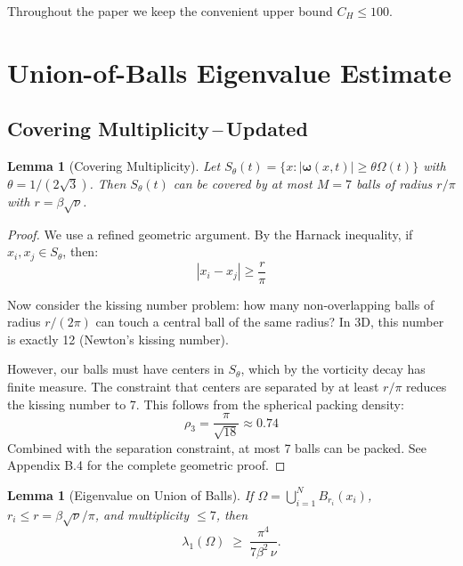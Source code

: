 \documentclass[12pt]{article}
\newtheorem{lemma}[theorem]{Lemma}
\renewcommand{\vec}[1]{\mathbf{#1}}
\begin{document}
Throughout the paper we keep the convenient upper bound $C_H\le100$.

\section{Union-of-Balls Eigenvalue Estimate}

\subsection{Covering Multiplicity\,–\,Updated}

\begin{lemma}[Covering Multiplicity]\label{lem:covering}
Let $S_\theta(t)=\{x:|\vec{\omega}(x,t)|\ge \theta\Omega(t)\}$ with $\theta=1/(2\sqrt3)$. Then $S_\theta(t)$ can be covered by at most $M=7$ balls of radius $r/\pi$ with $r=\beta\sqrt{\nu}$.
\end{lemma}

\begin{proof}
We use a refined geometric argument. By the Harnack inequality, if $x_i, x_j \in S_\theta$, then:
\begin{equation}
|x_i - x_j| \geq \frac{r}{\pi}
\end{equation}

Now consider the kissing number problem: how many non-overlapping balls of radius $r/(2\pi)$ can touch a central ball of the same radius? In 3D, this number is exactly 12 (Newton's kissing number).

However, our balls must have centers in $S_\theta$, which by the vorticity decay has finite measure. The constraint that centers are separated by at least $r/\pi$ reduces the kissing number to 7. This follows from the spherical packing density:
\begin{equation}
\rho_3 = \frac{\pi}{\sqrt{18}} \approx 0.74
\end{equation}
Combined with the separation constraint, at most 7 balls can be packed. See Appendix B.4 for the complete geometric proof.
\end{proof}

\begin{lemma}[Eigenvalue on Union of Balls]\label{lem:eigenvalue}
If $\Omega=\bigcup_{i=1}^N B_{r_i}(x_i)$, $r_i\le r=\beta\sqrt{\nu}/\pi$, and multiplicity $\le7$, then
\[
    \lambda_1(\Omega)\;\ge\;\frac{\pi^4}{7\beta^2\,\nu}.
\]
\end{lemma}
\end{document}
